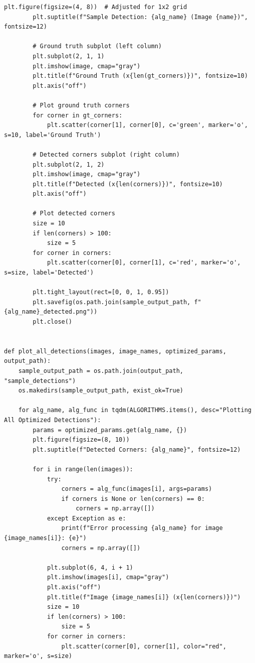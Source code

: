 \documentclass[journal]{IEEEtran}
\begin{document}
\begin{lstlisting}[style=python, caption={Utility Functions for Data Processing}, label={lst:utilities}]
        plt.figure(figsize=(4, 8))  # Adjusted for 1x2 grid
        plt.suptitle(f"Sample Detection: {alg_name} (Image {name})", fontsize=12)
        
        # Ground truth subplot (left column)
        plt.subplot(2, 1, 1)
        plt.imshow(image, cmap="gray")
        plt.title(f"Ground Truth (x{len(gt_corners)})", fontsize=10)
        plt.axis("off")
        
        # Plot ground truth corners
        for corner in gt_corners:
            plt.scatter(corner[1], corner[0], c='green', marker='o', s=10, label='Ground Truth')
        
        # Detected corners subplot (right column)
        plt.subplot(2, 1, 2)
        plt.imshow(image, cmap="gray")
        plt.title(f"Detected (x{len(corners)})", fontsize=10)
        plt.axis("off")
        
        # Plot detected corners
        size = 10
        if len(corners) > 100:
            size = 5
        for corner in corners:
            plt.scatter(corner[0], corner[1], c='red', marker='o', s=size, label='Detected')
        
        plt.tight_layout(rect=[0, 0, 1, 0.95])
        plt.savefig(os.path.join(sample_output_path, f"{alg_name}_detected.png"))
        plt.close()
        
        
def plot_all_detections(images, image_names, optimized_params, output_path):
    sample_output_path = os.path.join(output_path, "sample_detections")
    os.makedirs(sample_output_path, exist_ok=True)
    
    for alg_name, alg_func in tqdm(ALGORITHMS.items(), desc="Plotting All Optimized Detections"):
        params = optimized_params.get(alg_name, {})
        plt.figure(figsize=(8, 10))
        plt.suptitle(f"Detected Corners: {alg_name}", fontsize=12)
        
        for i in range(len(images)):
            try:
                corners = alg_func(images[i], args=params)
                if corners is None or len(corners) == 0:
                    corners = np.array([])
            except Exception as e:
                print(f"Error processing {alg_name} for image {image_names[i]}: {e}")
                corners = np.array([])
            
            plt.subplot(6, 4, i + 1)
            plt.imshow(images[i], cmap="gray")
            plt.axis("off")
            plt.title(f"Image {image_names[i]} (x{len(corners)})")
            size = 10
            if len(corners) > 100:
                size = 5
            for corner in corners:
                plt.scatter(corner[0], corner[1], color="red", marker='o', s=size)
        

\end{lstlisting}
\end{document}
